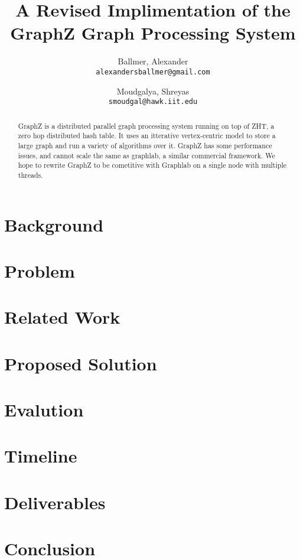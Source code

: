 \documentclass[10pt]{article}
\begin{document}
\title{A Revised Implimentation of the GraphZ Graph Processing System}

\author{
  Ballmer, Alexander\\
  \texttt{alexandersballmer@gmail.com}
  \and
  Moudgalya, Shreyas\\
  \texttt{smoudgal@hawk.iit.edu}
  }

\maketitle

\begin{abstract}
  GraphZ is a distributed parallel graph processing system running on top of ZHT, a zero hop distributed hash table. It uses an itterative vertex-centric model to store a large graph and run a variety of algorithms over it. GraphZ has some performance issues, and cannot scale the same as graphlab, a similar commercial framework. We hope to rewrite GraphZ to be cometitive with Graphlab on a single node with multiple threads.
\end{abstract}

\begin{multicols}{2} 
  \section{Background}
  \section{Problem}
  \section{Related Work}
  \section{Proposed Solution}
  \section{Evalution}
  \section{Timeline}
  \section{Deliverables}
  \section{Conclusion}
\end{multicols}
\end{document}
